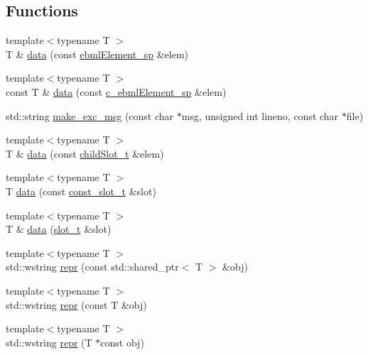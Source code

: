 \subsection*{Functions}
\begin{DoxyCompactItemize}
\item 
{\footnotesize template$<$typename T $>$ }\\T \& \mbox{\hyperlink{namespaceebml_ab21f8b4ff85186f670f17e84a02d9740}{data}} (const \mbox{\hyperlink{namespaceebml_adad533b7705a16bb360fe56380c5e7be}{ebml\+Element\+\_\+sp}} \&elem)
\item 
{\footnotesize template$<$typename T $>$ }\\const T \& \mbox{\hyperlink{namespaceebml_a9b10dec5a642a1703033296c3e892946}{data}} (const \mbox{\hyperlink{namespaceebml_a2deef4e8071531b32e3533f1bf978917}{c\+\_\+ebml\+Element\+\_\+sp}} \&elem)
\item 
std\+::string \mbox{\hyperlink{namespaceebml_a41bf8a299c4418f406beff89817b0690}{make\+\_\+exc\+\_\+msg}} (const char $\ast$msg, unsigned int lineno, const char $\ast$file)
\item 
{\footnotesize template$<$typename T $>$ }\\T \& \mbox{\hyperlink{namespaceebml_a6365629b3110a3c5d0cde94d08aac26c}{data}} (const \mbox{\hyperlink{classebml_1_1childSlot__t}{child\+Slot\+\_\+t}} \&elem)
\item 
{\footnotesize template$<$typename T $>$ }\\T \mbox{\hyperlink{namespaceebml_a766ff55857f1018516a926913abc8a83}{data}} (const \mbox{\hyperlink{classebml_1_1const__slot__t}{const\+\_\+slot\+\_\+t}} \&slot)
\item 
{\footnotesize template$<$typename T $>$ }\\T \& \mbox{\hyperlink{namespaceebml_ad2539ebb0462e9038828f80590adf688}{data}} (\mbox{\hyperlink{classebml_1_1slot__t}{slot\+\_\+t}} \&slot)
\item 
{\footnotesize template$<$typename T $>$ }\\std\+::wstring \mbox{\hyperlink{namespaceebml_a5478072bc68f4104a63a83d14785c9d2}{repr}} (const std\+::shared\+\_\+ptr$<$ T $>$ \&obj)
\item 
{\footnotesize template$<$typename T $>$ }\\std\+::wstring \mbox{\hyperlink{namespaceebml_a3c5e99350812f2a7182e2de8f1e46b3b}{repr}} (const T \&obj)
\item 
{\footnotesize template$<$typename T $>$ }\\std\+::wstring \mbox{\hyperlink{namespaceebml_ac8f264e994bf8c22e2a6a9624460ddf9}{repr}} (T $\ast$const obj)

\end{DoxyCompactItemize}
